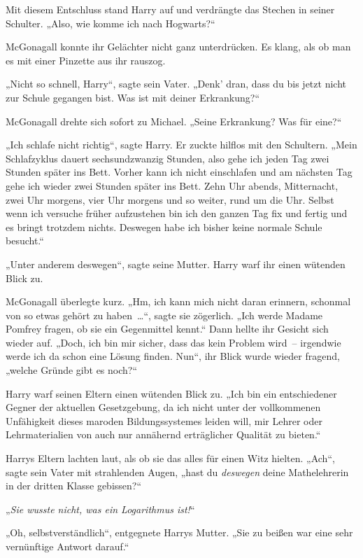 Mit diesem Entschluss stand Harry auf und verdrängte das Stechen in seiner Schulter. „Also, wie komme ich nach Hogwarts?“

McGonagall konnte ihr Gelächter nicht ganz unterdrücken. Es klang, als ob man es mit einer Pinzette aus ihr rauszog.

„Nicht so schnell, Harry“, sagte sein Vater. „Denk’ dran, dass du bis jetzt nicht zur Schule gegangen bist. Was ist mit deiner Erkrankung?“

McGonagall drehte sich sofort zu Michael. „Seine Erkrankung? Was für eine?“

„Ich schlafe nicht richtig“, sagte Harry. Er zuckte hilflos mit den Schultern. „Mein Schlafzyklus dauert sechsundzwanzig Stunden, also gehe ich jeden Tag zwei Stunden später ins Bett. Vorher kann ich nicht einschlafen und am nächsten Tag gehe ich wieder zwei Stunden später ins Bett. Zehn Uhr abends, Mitternacht, zwei Uhr morgens, vier Uhr morgens und so weiter, rund um die Uhr. Selbst wenn ich versuche früher aufzustehen bin ich den ganzen Tag fix und fertig und es bringt trotzdem nichts. Deswegen habe ich bisher keine normale Schule besucht.“

„Unter anderem deswegen“, sagte seine Mutter. Harry warf ihr einen wütenden Blick zu.

McGonagall überlegte kurz. „Hm, ich kann mich nicht daran erinnern, schonmal von so etwas gehört zu haben …“, sagte sie zögerlich. „Ich werde Madame Pomfrey fragen, ob sie ein Gegenmittel kennt.“ Dann hellte ihr Gesicht sich wieder auf. „Doch, ich bin mir sicher, dass das kein Problem wird – irgendwie werde ich da schon eine Lösung finden. Nun“, ihr Blick wurde wieder fragend, „welche Gründe gibt es noch?“

Harry warf seinen Eltern einen wütenden Blick zu. „Ich bin ein entschiedener Gegner der aktuellen Gesetzgebung, da ich nicht unter der vollkommenen Unfähigkeit dieses maroden Bildungssystemes leiden will, mir Lehrer oder Lehrmaterialien von auch nur annähernd erträglicher Qualität zu bieten.“

Harrys Eltern lachten laut, als ob sie das alles für einen Witz hielten. „Ach“, sagte sein Vater mit strahlenden Augen, „hast du \emph{deswegen} deine Mathelehrerin in der dritten Klasse gebissen?“

„\emph{Sie wusste nicht, was ein Logarithmus ist!}“

„Oh, selbstverständlich“, entgegnete Harrys Mutter. „Sie zu beißen war eine sehr vernünftige Antwort darauf.“


